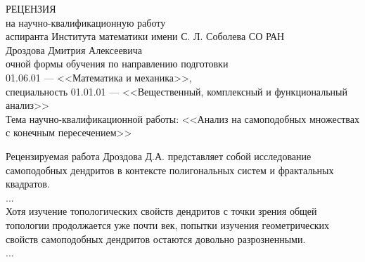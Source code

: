 \documentclass[oneside, 14pt, a4paper]{extreport}
\begin{document}
\begin{center}
РЕЦЕНЗИЯ\\
на научно-квалификационную работу\\
аспиранта Института математики имени С. Л. Соболева СО РАН\\
Дроздова Дмитрия Алексеевича\\
очной формы обучения по направлению подготовки\\
01.06.01 --- <<Математика и механика>>,\\
специальность 01.01.01 --- <<Вещественный, комплексный и функциональный анализ>>\\
Тема научно-квалификационной работы: <<Анализ на самоподобных множествах с конечным пересечением>>
\end{center}

%
%
%
%

Рецензируемая работа  Дроздова Д.А. представляет собой исследование самоподобных дендритов в контексте полигональных систем и фрактальных квадратов.\\
...\\


Хотя изучение топологических свойств дендритов с точки зрения общей топологии продолжается уже почти век, попытки изучения геометрических свойств самоподобных дендритов остаются довольно разрозненными.\\
...
\\
\end{document}

